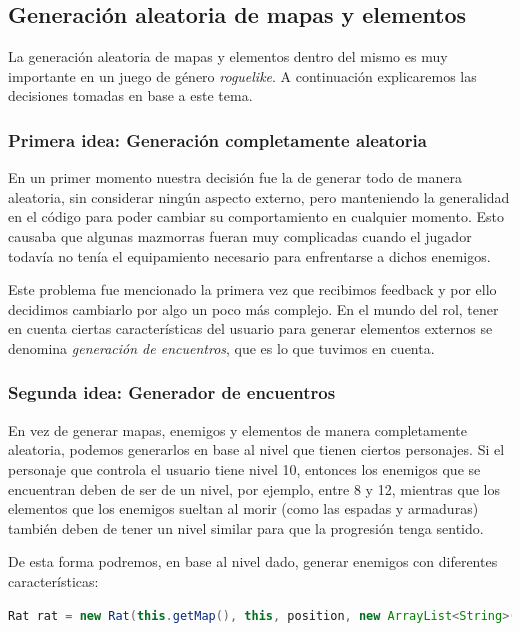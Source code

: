 \subsection{Generación aleatoria de mapas y elementos}

La generación aleatoria de mapas y elementos dentro del mismo es muy importante en un juego de género \textit{roguelike}. A continuación explicaremos las decisiones tomadas en base a este tema.

\subsubsection{Primera idea: Generación completamente aleatoria}

En un primer momento nuestra decisión fue la de generar todo de manera aleatoria, sin considerar ningún aspecto externo, pero manteniendo la generalidad en el código para poder cambiar su comportamiento en cualquier momento. Esto causaba que algunas mazmorras fueran muy complicadas cuando el jugador todavía no tenía el equipamiento necesario para enfrentarse a dichos enemigos.

Este problema fue mencionado la primera vez que recibimos feedback y por ello decidimos cambiarlo por algo un poco más complejo. En el mundo del rol, tener en cuenta ciertas características del usuario para generar elementos externos se denomina \textit{generación de encuentros}, que es lo que tuvimos en cuenta.

\subsubsection{Segunda idea: Generador de encuentros}
\label{generadorencuentros}

En vez de generar mapas, enemigos y elementos de manera completamente aleatoria, podemos generarlos en base al nivel que tienen ciertos personajes. Si el personaje que controla el usuario tiene nivel 10, entonces los enemigos que se encuentran deben de ser de un nivel, por ejemplo, entre 8 y 12, mientras que los elementos que los enemigos sueltan al morir (como las espadas y armaduras) también deben de tener un nivel similar para que la progresión tenga sentido.

De esta forma podremos, en base al nivel dado, generar enemigos con diferentes características:

\begin{lstlisting}[language=java]
Rat rat = new Rat(this.getMap(), this, position, new ArrayList<String>(), level);
\end{lstlisting}